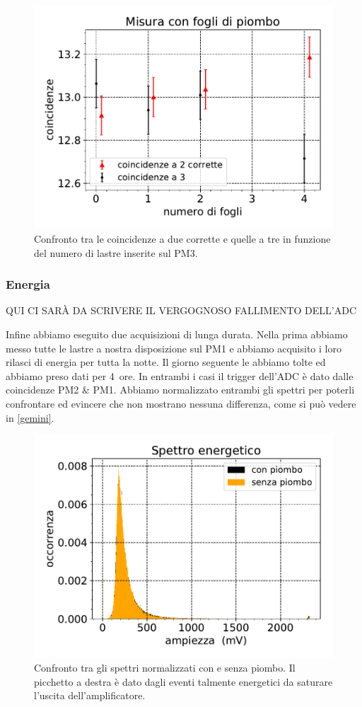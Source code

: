 \begin{figure}[h]
\centering
\includegraphics[width=8 cm]{confronto}
\caption{Confronto tra le coincidenze a due corrette e quelle a tre in funzione del numero di lastre inserite sul PM3.}
\label{cfr}
\end{figure}

\subsubsection{Energia}

\begin{huge}
QUI CI SAR\`A DA SCRIVERE IL VERGOGNOSO FALLIMENTO DELL'ADC
\end{huge}

Infine abbiamo eseguito due acquisizioni di lunga durata. Nella prima abbiamo messo tutte le lastre a nostra disposizione sul PM1 e abbiamo acquisito i loro rilasci di energia per tutta la notte. Il giorno seguente le abbiamo tolte ed abbiamo preso dati per \SI{4}{ore}. In entrambi i casi il trigger dell'ADC è dato dalle coincidenze PM2 \& PM1.  Abbiamo normalizzato 
entrambi gli spettri per poterli confrontare ed evincere che non mostrano nessuna differenza, come si può vedere in \autoref{gemini}. 

\begin{figure}[h]
\centering
\includegraphics[width=8 cm]{gemelli}
\caption{Confronto tra gli spettri normalizzati con e senza piombo. Il picchetto a destra è dato dagli eventi talmente energetici da saturare l'uscita dell'amplificatore.}
\label{gemini}    
\end{figure}

